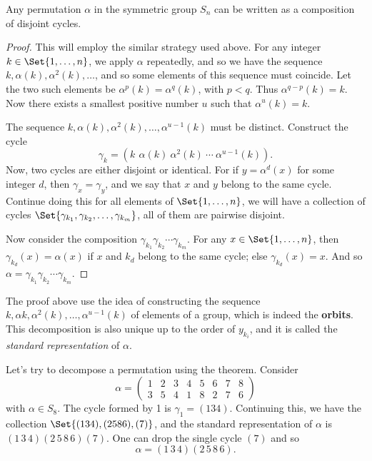 \documentclass[main.tex]{subfiles}
\begin{document}
				\begin{theorem}
					Any permutation $\alpha$ in the symmetric group $S_n$ can be written as a composition of disjoint cycles.
				\end{theorem}
				\begin{proof}
					This will employ the similar strategy used above. For any integer $k \in \Set{1, \ldots, n}$, we apply $\alpha$ repeatedly, and so we have the sequence $k, \alpha (k), \alpha^2 (k), \ldots$, and so some elements of this sequence must coincide. Let the two such elements be $\alpha^p(k) = \alpha^q (k)$, with $p < q$. Thus $\alpha^{q - p}(k) = k$. Now there exists a smallest positive number $u$ such that $\alpha^u (k) = k$.
					
					The sequence  $k, \alpha (k), \alpha^2 (k), \ldots, \alpha^{u-1}(k)$ must be distinct. Construct the cycle 
					\begin{equation*}
					\gamma_k = (k \:\, \alpha (k) \: \alpha^2 (k) \: \cdots \: \alpha^{u-1}(k)).
					\end{equation*} 
					Now, two cycles are either disjoint or identical. For if $y = \alpha^{d} (x)$ for some integer $d$, then $\gamma_x = \gamma_y$, and we say that $x$ and $y$ belong to the same cycle. Continue doing this for all elements of $\Set{1, \ldots, n}$, we will have a collection of cycles $\Set{\gamma_{k_1}, \gamma_{k_2}, \ldots, \gamma_{k_m}}$, all of them are pairwise disjoint.
					
					Now consider the composition $\gamma_{k_1}\gamma_{k_2}\cdots\gamma_{k_m}$. For any $x \in \Set{1, \ldots, n}$, then $\gamma_{k_d}(x) = \alpha(x)$ if $x$ and $k_d$ belong to the same cycle; else $\gamma_{k_d}(x) = x$. And so $\alpha = \gamma_{k_1}\gamma_{k_2}\cdots\gamma_{k_m}$.
				\end{proof}
				The proof above use the idea of constructing the sequence $k, \alpha k, \alpha^2 (k), \ldots ,\alpha^{u-1} (k)$ of elements of a group, which is indeed the \textbf{orbits}. This decomposition is also unique up to the order of $y_{k_i}$, and it is called the \textit{standard representation} of $\alpha$.
				
				Let's try to decompose a permutation using the theorem. Consider
				\begin{equation*}
				\alpha =
				\begin{pmatrix}
				1 & 2 & 3 & 4 & 5 & 6 & 7 & 8 \\
				3 & 5 & 4 & 1 & 8 & 2 & 7 & 6
				\end{pmatrix}
				\end{equation*}
				with $\alpha \in S_{8}$. The cycle formed by 1 is $\gamma_1 = (1 3 4)$. Continuing this, we have the collection $\Set{(1 3 4), (2 5 8 6), (7)}$, and the standard representation of $\alpha$ is $(1\,3\,4)(2\,5\, 8\,6)(7)$. One can drop the single cycle $(7)$ and so
				\begin{equation*}
					\alpha = (1\,3\,4)(2\,5\, 8\,6).
				\end{equation*}
				
\end{document}
